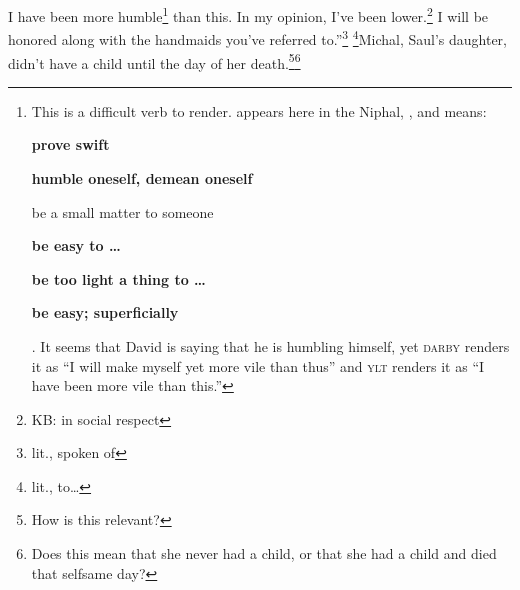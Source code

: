 \begin{inparaenum}
     I have been more humble\footnote{This is a difficult verb to render.  appears here in the Niphal, , and means: %
    \begin{inparaenum}
        \item \textbf{prove swift}
        \item \textbf{humble oneself, demean oneself}
        \item be a small matter to someone
        \item \textbf{be easy to \dots}
        \item \textbf{be too light a thing to \dots}
        \item \textbf{be easy; superficially}
    \end{inparaenum}%
    . It seems that David is saying that he is humbling himself, yet \textsc{darby} renders it as ``I will make myself yet more vile than thus'' and \textsc{ylt} renders it as ``I have been more vile than this.''} than this. In my opinion, I've been lower.\footnote{KB: in social respect} I will be honored along with the handmaids you've referred to.''\footnote{lit., spoken of}%
     \footnote{lit., to\dots}Michal, Saul's daughter, didn't have a child until the day of her death.\footnote{How is this relevant?}\footnote{Does this mean that she never had a child, or that she had a child and died that selfsame day?}%
\end{inparaenum}
